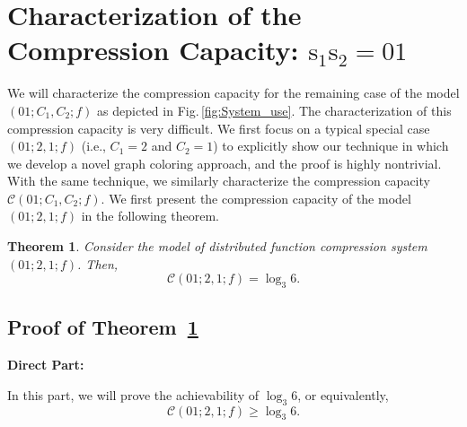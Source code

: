 \documentclass[11pt,draftclsnofoot,onecolumn]{IEEEtran}
\newtheorem{theorem}{Theorem}
\begin{document}
\section{Characterization of the Compression Capacity: $\boldsymbol{\mathrm{s}}_1\boldsymbol{\mathrm{s}}_2=01$}\label{sec:compre-cap01}



We will characterize the compression capacity for the remaining case of the model $(01;C_1,C_2;f)$ as depicted in Fig.\,\ref{fig:System_use}. The characterization of this compression capacity is very difficult. We first focus on a typical special case $(01;2,1;f)$ (i.e., $C_1=2$ and $C_2=1$) to explicitly show our technique in which we develop a novel graph coloring approach, and the proof is highly nontrivial. With the same technique, we similarly characterize the compression capacity $\mathcal{C}(01;C_1,C_2;f)$. We first present the compression capacity of the model $(01;2,1;f)$ in the following theorem.

\begin{theorem}\label{thm:01;2,1-comp-cap}
Consider the model of distributed function compression system $(01;2,1;  f)$. Then,
\begin{equation*}
\mathcal{C}(01;2,1;f)=\log_{3} 6.
\end{equation*}
\end{theorem}

\subsection{Proof of Theorem~\ref{thm:01;2,1-comp-cap}}\label{subsec_pf_Thm4}


\smallskip
\noindent\textbf{Direct Part:}

 In this part, we will prove the achievability of $\log_{3}6$, or equivalently,
\begin{equation*}
\mathcal{C}(01;2,1;f)\geq\log_{3}6.\label{N_cap_low_bound_log_3_6}
\end{equation*}
\end{document}
